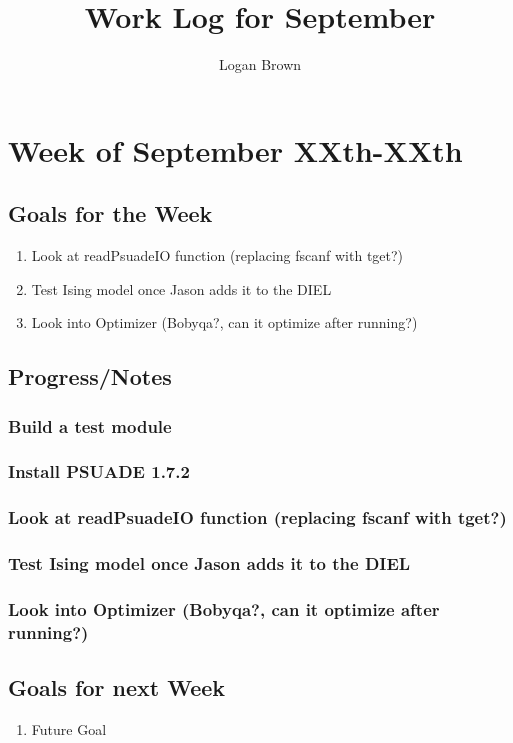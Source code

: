 

\title{Work Log for September}
\author{Logan Brown}


\maketitle


\setcounter{section}{0} %
\setcounter{subsection}{-1}
\setcounter{subsubsection}{0}

\section{Week of September XXth-XXth}
\subsection{Goals for the Week}
\begin{enumerate}
	\item Look at readPsuadeIO function (replacing fscanf with tget?)
	\item Test Ising model once Jason adds it to the DIEL
	\item Look into Optimizer (Bobyqa?, can it optimize after running?)
\end{enumerate}

\subsection{Progress/Notes}

\subsubsection{Build a test module}

\subsubsection{Install PSUADE 1.7.2}

\subsubsection{Look at readPsuadeIO function (replacing fscanf with tget?)}

\subsubsection{Test Ising model once Jason adds it to the DIEL}

\subsubsection{Look into Optimizer (Bobyqa?, can it optimize after running?)}



\subsection{Goals for next Week}
\begin{enumerate}
\item Future Goal
\end{enumerate}


